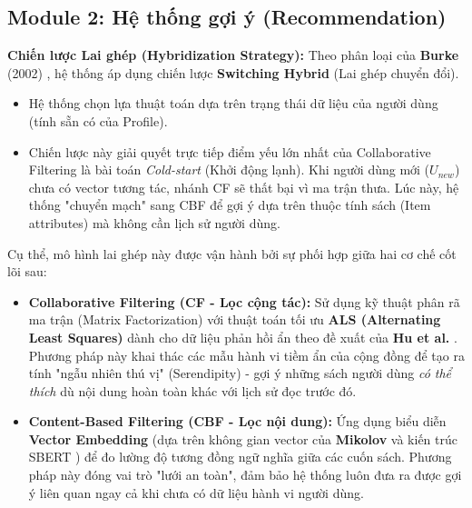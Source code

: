 \subsection{Module 2: Hệ thống gợi ý (Recommendation)}

\textbf{Chiến lược Lai ghép (Hybridization Strategy):}
Theo phân loại của \textbf{Burke} (2002) \cite{Burke2002Hybrid}, hệ thống áp dụng chiến lược \textbf{Switching Hybrid} (Lai ghép chuyển đổi).
\begin{itemize}
    \item Hệ thống chọn lựa thuật toán dựa trên trạng thái dữ liệu của người dùng (tính sẵn có của Profile).
    \item Chiến lược này giải quyết trực tiếp điểm yếu lớn nhất của Collaborative Filtering là bài toán \textit{Cold-start} (Khởi động lạnh). Khi người dùng mới ($U_{new}$) chưa có vector tương tác, nhánh CF sẽ thất bại vì ma trận thưa. Lúc này, hệ thống "chuyển mạch" sang CBF để gợi ý dựa trên thuộc tính sách (Item attributes) mà không cần lịch sử người dùng.
\end{itemize}

Cụ thể, mô hình lai ghép này được vận hành bởi sự phối hợp giữa hai cơ chế cốt lõi sau:

\begin{itemize}
    \item \textbf{Collaborative Filtering (CF - Lọc cộng tác):} Sử dụng kỹ thuật phân rã ma trận (Matrix Factorization) với thuật toán tối ưu \textbf{ALS (Alternating Least Squares)} dành cho dữ liệu phản hồi ẩn theo đề xuất của \textbf{Hu et al.} \cite{Hu2008ImplicitCF}. Phương pháp này khai thác các mẫu hành vi tiềm ẩn của cộng đồng để tạo ra tính "ngẫu nhiên thú vị" (Serendipity) - gợi ý những sách người dùng \textit{có thể thích} dù nội dung hoàn toàn khác với lịch sử đọc trước đó.
    
    \item \textbf{Content-Based Filtering (CBF - Lọc nội dung):} Ứng dụng biểu diễn \textbf{Vector Embedding} (dựa trên không gian vector của \textbf{Mikolov} \cite{Mikolov2013Efficient} và kiến trúc SBERT \cite{Reimers2019SentenceBERT}) để đo lường độ tương đồng ngữ nghĩa giữa các cuốn sách. Phương pháp này đóng vai trò "lưới an toàn", đảm bảo hệ thống luôn đưa ra được gợi ý liên quan ngay cả khi chưa có dữ liệu hành vi người dùng.
\end{itemize}




